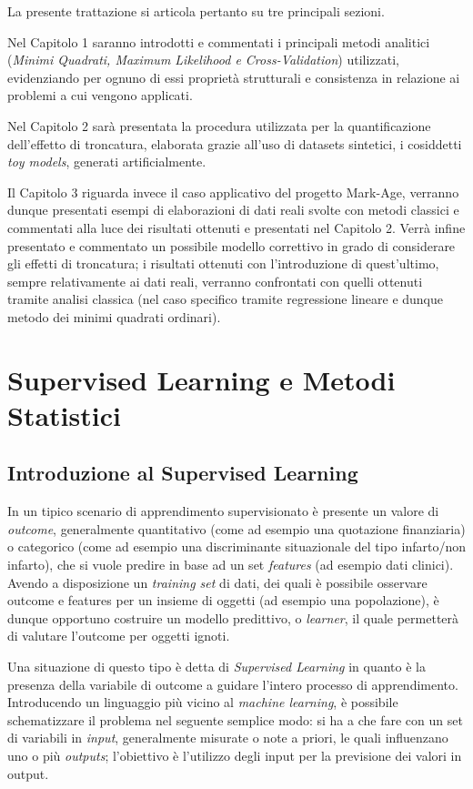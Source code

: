 \documentclass[12pt,openright,twoside,a4paper]{book}
\begin{document}
La presente trattazione si articola pertanto su tre principali sezioni.

Nel Capitolo 1 saranno introdotti e commentati i principali metodi analitici (\textit{Minimi Quadrati, Maximum Likelihood e Cross-Validation}) utilizzati, evidenziando per ognuno di essi proprietà strutturali e consistenza in relazione ai problemi a cui vengono applicati.

Nel Capitolo 2 sarà presentata la procedura utilizzata per la quantificazione dell'effetto di troncatura, elaborata grazie all'uso di datasets sintetici, i cosiddetti \textit{toy models}, generati artificialmente.

Il Capitolo 3 riguarda invece il caso applicativo del progetto Mark-Age, verranno dunque presentati esempi di elaborazioni di dati reali svolte con metodi classici e commentati alla luce dei risultati ottenuti e presentati nel Capitolo 2.
Verrà infine presentato e commentato un possibile modello correttivo in grado di considerare gli effetti di troncatura; i risultati ottenuti con l'introduzione di quest'ultimo, sempre relativamente ai dati reali, verranno confrontati con quelli ottenuti tramite analisi classica (nel caso specifico tramite regressione lineare e dunque metodo dei minimi quadrati ordinari).

\mainmatter

\chapter{Supervised Learning e Metodi Statistici}

\section{Introduzione al Supervised Learning}
In un tipico scenario di apprendimento supervisionato è presente un valore di \textit{outcome}, generalmente quantitativo (come ad esempio una quotazione finanziaria) o categorico (come ad esempio una discriminante situazionale del tipo infarto/non infarto), che si vuole predire in base ad un set \textit{features} (ad esempio dati clinici).
Avendo a disposizione un \textit{training set} di dati, dei quali è possibile osservare outcome e features per un insieme di oggetti (ad esempio una popolazione), è dunque opportuno costruire un modello predittivo, o \textit{learner}, il quale permetterà di valutare l'outcome per oggetti ignoti.

Una situazione di questo tipo è detta di \textit{Supervised Learning} in quanto è la presenza della variabile di outcome a guidare l'intero processo di apprendimento.
Introducendo un linguaggio più vicino al \textit{machine learning}, è possibile schematizzare il problema nel seguente semplice modo: si ha a che fare con un set di variabili in \textit{input}, generalmente misurate o note a priori, le quali influenzano uno o più \textit{outputs}; l'obiettivo è l'utilizzo degli input per la previsione dei valori in output.
\end{document}
